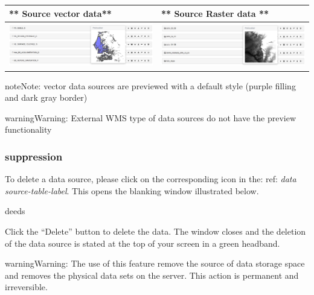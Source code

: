 \documentclass[letterpaper,10pt,english]{sphinxmanual}
\begin{document}
\begin{tabulary}{\linewidth}{|L|L|}
\hline

** Source vector data**
 & 
** Source Raster data **
\\
\hline
\includegraphics[width=1.000\linewidth]{preview-vector-window.png}
 & 
\includegraphics[width=1.000\linewidth]{preview-raster-window.png}
\\
\hline\end{tabulary}


\begin{notice}{note}{Note:}
vector data sources are previewed with a default style (purple filling and dark gray border)
\end{notice}

\begin{notice}{warning}{Warning:}
External WMS type of data sources do not have the preview functionality
\end{notice}


\subsubsection{suppression}
\label{data/datasources:suppression}
To delete a data source, please click on the corresponding icon in the: ref: \emph{data source-table-label}. This opens the blanking window illustrated below.

deeds

Click the ``Delete'' button to delete the data. The window closes and the deletion of the data source is stated at the top of your screen in a green headband.

\begin{notice}{warning}{Warning:}
The use of this feature remove the source of data storage space and removes the physical data sets on the server. This action is permanent and irreversible.
\end{notice}
\end{document}
